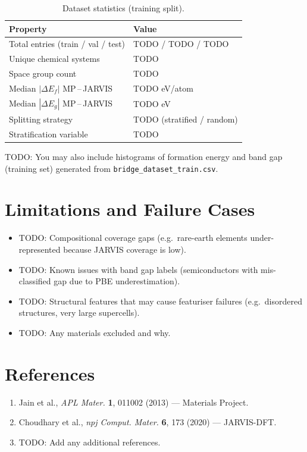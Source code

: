 \documentclass[10pt, a4paper]{article}
\begin{document}
\begin{table}[h!]
\centering
\caption{Dataset statistics (training split).}
\label{tab:datacard}
\begin{tabular}{@{}ll@{}}
\toprule
Property & Value \\
\midrule
Total entries (train / val / test) & TODO / TODO / TODO \\
Unique chemical systems            & TODO \\
Space group count                  & TODO \\
Median \(|\Delta E_f|\) MP\,--\,JARVIS & TODO eV/atom \\
Median \(|\Delta E_g|\) MP\,--\,JARVIS & TODO eV \\
Splitting strategy                 & TODO (stratified / random) \\
Stratification variable            & TODO \\
\bottomrule
\end{tabular}
\end{table}

TODO: You may also include histograms of formation energy and band gap
(training set) generated from \texttt{bridge\_dataset\_train.csv}.

\section{Limitations and Failure Cases}

\begin{itemize}
  \item TODO: Compositional coverage gaps (e.g.\ rare-earth elements
    under-represented because JARVIS coverage is low).
  \item TODO: Known issues with band gap labels (semiconductors with
    mis-classified gap due to PBE underestimation).
  \item TODO: Structural features that may cause featuriser failures
    (e.g.\ disordered structures, very large supercells).
  \item TODO: Any materials excluded and why.
\end{itemize}

\section*{References}

\begin{enumerate}
  \item Jain et al., \textit{APL Mater.} \textbf{1}, 011002 (2013) —
    Materials Project.
  \item Choudhary et al., \textit{npj Comput. Mater.} \textbf{6}, 173 (2020)
    — JARVIS-DFT.
  \item TODO: Add any additional references.
\end{enumerate}
\end{document}
